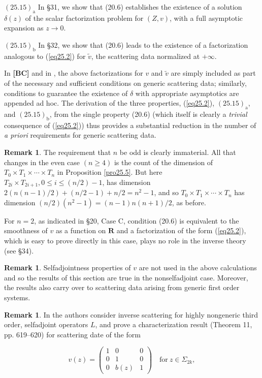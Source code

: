 \documentclass{surv-l}
\theoremstyle{plain}
\theoremstyle{definition}
\newtheorem{remark}[theorem]{Remark}
\numberwithin{equation}{chapter}
\begin{document}
$(25.15)_{\mathrm{a}}$ In \S31, we show that (20.6) establishes the existence of a solution $\delta(z)$ of the scalar factorization problem for $(Z, v)$, with a full asymptotic expansion as $z\rightarrow 0$.

$(25.15)_{\mathrm{b}}$ In \S 32, we show that (20.6) leads to the existence of a factorization analogous to (\ref{eq25.2}) for $\tilde{v}$, the scattering data normalized at $+\infty$.

In \textbf{[BC]} and in \cite{Be}, the above factorizations for $v$ and $\tilde{v}$ are simply included as part of the necessary and sufficient conditions on generic scattering data; similarly, conditions to guarantee the existence of $\delta$ with appropriate asymptotics are appended ad hoc. The derivation of the three properties, (\ref{eq25.2}), $\mathrm{(25.15)_{a}}$, and $\mathrm{(25.15)_{b}}$, from the single property (20.6) (which itself is clearly a \emph{trivial} consequence of (\ref{eq25.2})) thus provides a substantial reduction in the number of \emph{a priori} requirements for generic scattering data.

\begin{remark}\label{rem25.16}
The requirement that $n$ be odd is clearly immaterial. All that changes in the even case $(n\geq 4)$ is the count of the dimension of $ T_{0}\times  T_{1}\times \cdots \times T_{n}$ in Proposition \ref{pro25.5}. But here $T_{2i}\times T_{2i+1},0\leq i\leq(n/2)-1$, has dimension $2(n(n-1)/2)+(n/2-1)+n/2=n^{2}-1$, and so $ T_{0}\times T_{1}\times \cdots \times T_{n}$ has dimension $(n/2)(n^{2}-1)=(n-1)n(n+1)/2$, as before.
\end{remark}

For $n=2$, as indicated in \S 20, Case C, condition (20.6) is equivalent to the smoothness of $v$ as a function on $\mathbf{R}$ and a factorization of the form (\ref{eq25.2}), which is easy to prove directly in this case, plays no role in the inverse theory (see \S 34).

\begin{remark}\label{rem25.17}
Selfadjointness properties of $v$ are not used in the above calculations and so the results of this section are true in the nonselfadjoint case. Moreover, the results also carry over to scattering data arising from generic first order systems.
\end{remark}

\begin{remark}\label{rem25.18}
In \cite{DTT} the authors consider inverse scattering for highly nongeneric third order, selfadjoint operators $L$, and prove a characterization result (Theorem 11, pp. 619--620) for scattering date of the form
\end{remark}
\setcounter{equation}{18}
\begin{equation}\label{eq25.19}
v(z)=\left(\begin{array}{ccc}
1 & 0 & 0\\
0 & 1 & 0\\
0 & b(z) & 1
\end{array}\right)\quad \mathrm{for}\ z\in\Sigma_{2k},
\end{equation}
\end{document}
